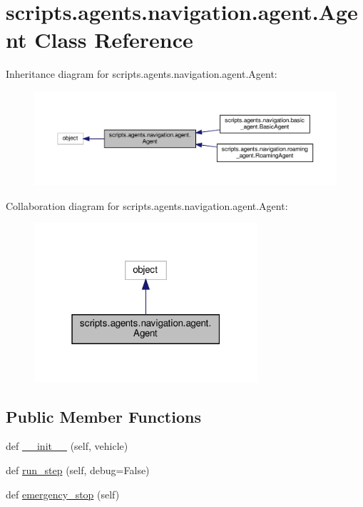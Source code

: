 \hypertarget{classscripts_1_1agents_1_1navigation_1_1agent_1_1Agent}{}\section{scripts.\+agents.\+navigation.\+agent.\+Agent Class Reference}
\label{classscripts_1_1agents_1_1navigation_1_1agent_1_1Agent}


Inheritance diagram for scripts.\+agents.\+navigation.\+agent.\+Agent\+:\nopagebreak
\begin{figure}[H]
\begin{center}
\leavevmode
\includegraphics[width=350pt]{d5/d7e/classscripts_1_1agents_1_1navigation_1_1agent_1_1Agent__inherit__graph}
\end{center}
\end{figure}


Collaboration diagram for scripts.\+agents.\+navigation.\+agent.\+Agent\+:\nopagebreak
\begin{figure}[H]
\begin{center}
\leavevmode
\includegraphics[width=235pt]{de/d72/classscripts_1_1agents_1_1navigation_1_1agent_1_1Agent__coll__graph}
\end{center}
\end{figure}
\subsection*{Public Member Functions}
\begin{DoxyCompactItemize}
\item 
def \hyperlink{classscripts_1_1agents_1_1navigation_1_1agent_1_1Agent_a0e2995e9cfb9a78b724338a26f565c13}{\+\_\+\+\_\+init\+\_\+\+\_\+} (self, vehicle)
\item 
def \hyperlink{classscripts_1_1agents_1_1navigation_1_1agent_1_1Agent_a0271d9ffb0c84bae593bce700a9cf5bc}{run\+\_\+step} (self, debug=False)
\item 
def \hyperlink{classscripts_1_1agents_1_1navigation_1_1agent_1_1Agent_a6c3c4d0e421923e9c4f1bbd478c1f9ea}{emergency\+\_\+stop} (self)
\end{DoxyCompactItemize}


